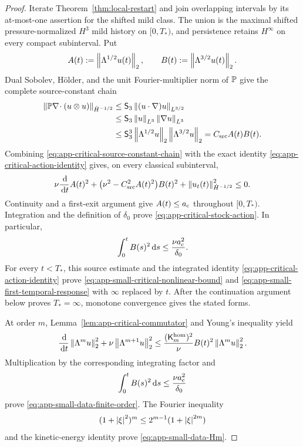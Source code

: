 \begin{proof}
Iterate Theorem~\ref{thm:local-restart} and join overlapping intervals by
its at-most-one assertion for the shifted mild class.  The union is the
maximal shifted pressure-normalized \(H^3\) mild history on \([0,T_*)\), and
persistence retains \(H^\infty\) on
every compact subinterval.  Put
\[
 A(t):=\left\lVert \Lambda^{1/2}u(t)\right\rVert_2,
 \qquad
 B(t):=\left\lVert \Lambda^{3/2}u(t)\right\rVert_2.
\]
 Dual Sobolev, H\"older, and the unit Fourier-multiplier norm of \(\mathbb P\)
give the complete source-constant chain
\begin{align}
 \left\lVert \mathbb P\nabla\!\cdot(u\otimes u)\right\rVert_{\dot H^{-1/2}}
 &\le \mathsf S_3\left\lVert (u\cdot\nabla)u\right\rVert_{L^{3/2}}
 \notag\\
 &\le \mathsf S_3\left\lVert u\right\rVert_{L^3}\left\lVert \nabla u\right\rVert_{L^3}
 \notag\\
 &\le \mathsf S_3^3
      \left\lVert \Lambda^{1/2}u\right\rVert_2
      \left\lVert \Lambda^{3/2}u\right\rVert_2
 =C_{\rm src}A(t)B(t).
 \label{eq:app-critical-source-constant-chain}
\end{align}
Combining \eqref{eq:app-critical-source-constant-chain} with the exact
identity \eqref{eq:app-critical-action-identity} gives, on every classical
subinterval,
\[
 \nu\frac{\,\mathrm d}{\,\mathrm d t}A(t)^2
 +\bigl(\nu^2-C_{\rm src}^2A(t)^2\bigr)B(t)^2
 +\left\lVert u_t(t)\right\rVert_{\dot H^{-1/2}}^2\le0.
\]
Continuity and a first-exit argument give \(A(t)\le a_{\rm c}\) throughout
\([0,T_*)\).  Integration and the definition of \(\delta_0\) prove
\eqref{eq:app-critical-stock-action}.  In particular,
\[
 \int_0^tB(s)^2\,\mathrm d s\le\frac{\nu a_{\rm c}^2}{\delta_0}.
\]
For every \(t<T_*\), this source estimate and the integrated identity
\eqref{eq:app-critical-action-identity} prove
\eqref{eq:app-small-critical-nonlinear-bound} and
\eqref{eq:app-small-first-temporal-response} with \(\infty\) replaced by
\(t\).  After the continuation argument below proves \(T_*=\infty\),
monotone convergence gives the stated forms.

At order \(m\), Lemma~\ref{lem:app-critical-commutator} and Young's
inequality yield
\[
 \frac{\,\mathrm d}{\,\mathrm d t}\left\lVert \Lambda^mu\right\rVert_2^2
 +\nu\left\lVert \Lambda^{m+1}u\right\rVert_2^2
 \le
 \frac{(\mathsf K_m^{\rm hom})^2}{\nu}
 B(t)^2\left\lVert \Lambda^mu\right\rVert_2^2.
\]
Multiplication by the corresponding integrating factor and
\[
 \int_0^tB(s)^2\,\mathrm d s\le\frac{\nu a_{\rm c}^2}{\delta_0}
\]
prove \eqref{eq:app-small-data-finite-order}.  The Fourier inequality
\[
 (1+\left|\xi\right|^2)^m\le2^{m-1}(1+\left|\xi\right|^{2m})
\]
and the kinetic-energy identity prove \eqref{eq:app-small-data-Hm}.


\end{proof}
